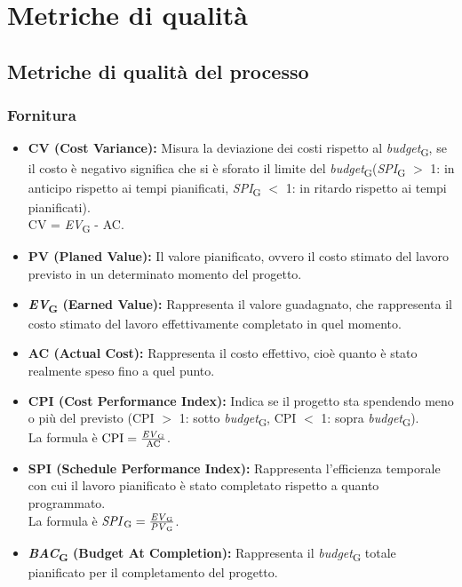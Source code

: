 \section{Metriche di qualità}
\subsection{Metriche di qualità del processo}
\subsubsection{Fornitura}
\begin{itemize}
    \item \textbf{CV (Cost Variance):} Misura la deviazione dei costi rispetto al \textit{budget}\textsubscript{G}, se il costo è negativo significa che si è sforato il limite del \textit{budget}\textsubscript{G}(\textit{SPI}\textsubscript{G} \( > \) 1: in anticipo rispetto ai tempi pianificati, \textit{SPI}\textsubscript{G} \( < \) 1: in ritardo rispetto ai tempi pianificati).
    \\CV = \textit{EV}\textsubscript{G} - AC.
    \item \textbf{PV (Planed Value):} Il valore pianificato, ovvero il costo stimato del lavoro previsto in un determinato momento del progetto.
    \item \textbf{\textit{EV}\textsubscript{G} (Earned Value):} Rappresenta il valore guadagnato, che rappresenta il costo stimato del lavoro effettivamente completato in quel momento.
    \item \textbf{AC (Actual Cost):} Rappresenta il costo effettivo, cioè quanto è stato realmente speso fino a quel punto.
    \item \textbf{CPI (Cost Performance Index):} Indica se il progetto sta spendendo meno o più del previsto (CPI \( > \) 1: sotto \textit{budget}\textsubscript{G}, CPI \( < \) 1: sopra \textit{budget}\textsubscript{G}). \\ La formula è \( \text{CPI} = \frac{\text{\textit{EV}\textsubscript{G}}}{\text{AC}} \).
    \item \textbf{SPI (Schedule Performance Index):} Rappresenta l'efficienza temporale con cui il lavoro pianificato è stato completato rispetto a quanto programmato.
    \\ La formula è \( \text{\textit{SPI}\textsubscript{G}} = \frac{\text{\textit{EV}\textsubscript{G}}}{\text{\textit{PV}\textsubscript{G}}} \).
    \item \textbf{\textit{BAC}\textsubscript{G} (Budget At Completion):} Rappresenta il \textit{budget}\textsubscript{G} totale pianificato per il completamento del progetto.

\end{itemize}
